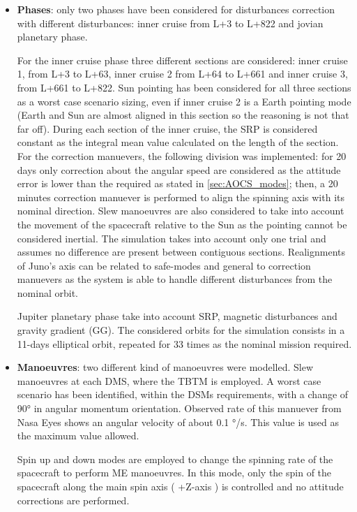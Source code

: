 \begin{itemize}
    \item \textbf{Phases}: only two phases have been considered for disturbances correction with different disturbances: inner cruise from L+3 to L+822 and jovian planetary phase. 
    
    For the inner cruise phase three different sections are considered: inner cruise 1, from L+3 to L+63, inner cruise 2 from L+64 to L+661 and inner cruise 3, from L+661 to L+822. Sun pointing has been considered for all three sections as a worst case scenario sizing, even if inner cruise 2 is a Earth pointing mode (Earth and Sun are almost aligned in this section so the reasoning is not that far off). During each section of the inner cruise, the SRP is considered constant as the integral mean value calculated on the length of the section.
     For the correction manuevers, the following division was implemented: for 20 days only correction about the angular speed are considered as the attitude error is lower than the required as stated in \autoref{sec:AOCS_modes}; then, a 20 minutes correction manuever is performed to align the spinning axis with its nominal direction. Slew manoeuvres are also considered to take into account the movement of the spacecraft relative to the Sun as the pointing cannot be considered inertial. The simulation takes into account only one trial and assumes no difference are present between contiguous sections. Realignments of Juno's axis can be related to safe-modes and general to correction manuevers as the system is able to handle different disturbances from the nominal orbit. 
    
    Jupiter planetary phase take into account SRP, magnetic disturbances and gravity gradient (GG). The considered orbits for the simulation consists in a 11-days elliptical orbit, repeated for 33 times as the nominal mission required. 

    \item \textbf{Manoeuvres}: two different kind of manoeuvres were modelled. Slew manoeuvres at each DMS, where the TBTM is employed. A worst case scenario has been identified, within the DSMs requirements, with a change of 90° in angular momentum orientation. Observed rate of this manuever from Nasa Eyes\cite{nasa_eyes} shows an angular velocity of about 0.1 °/s. This value is used as the maximum value allowed. 
    
    Spin up and down modes are employed to change the spinning rate of the spacecraft to perform ME manoeuvres. In this mode, only the spin of the spacecraft along the main spin axis ( +Z-axis ) is controlled and no attitude corrections are performed.      

\end{itemize}

